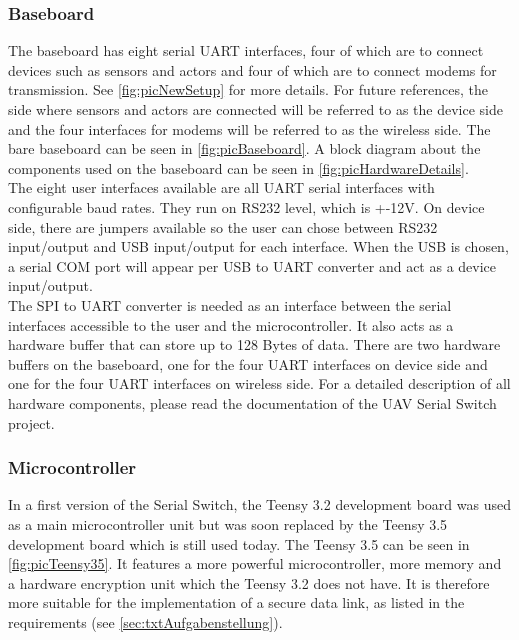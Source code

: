 \subsubsection{Baseboard}
%
%
The baseboard has eight serial UART interfaces, four of which are to connect devices such as sensors and actors and four of which are to connect modems for transmission. See \autoref{fig:picNewSetup} for more details. For future references, the side where sensors and actors are connected will be referred to as the device side and the four interfaces for modems will be referred to as the wireless side. The bare baseboard can be seen in \autoref{fig:picBaseboard}. A block diagram about the components used on the baseboard can be seen in \autoref{fig:picHardwareDetails}.\\
The eight user interfaces available are all UART serial interfaces with configurable baud rates. They run on RS232 level, which is +-12V. On device side, there are jumpers available so the user can chose between RS232 input/output and USB input/output for each interface. When the USB is chosen, a serial COM port will appear per USB to UART converter and act as a device input/output.\\
The SPI to UART converter is needed as an interface between the serial interfaces accessible to the user and the microcontroller. It also acts as a hardware buffer that can store up to 128 Bytes of data. There are two hardware buffers on the baseboard, one for the four UART interfaces on device side and one for the four UART interfaces on wireless side. For a detailed description of all hardware components, please read the documentation of the UAV Serial Switch project.
%
\subsubsection{Microcontroller}
%
In a first version of the Serial Switch, the Teensy 3.2 development board was used as a main microcontroller unit but was soon replaced by the Teensy 3.5 development board which is still used today. The Teensy 3.5 can be seen in \autoref{fig:picTeensy35}. It features a more powerful microcontroller, more memory and a hardware encryption unit which the Teensy 3.2 does not have. It is therefore more suitable for the implementation of a secure data link, as listed in the requirements (see \autoref{sec:txtAufgabenstellung}).
%
